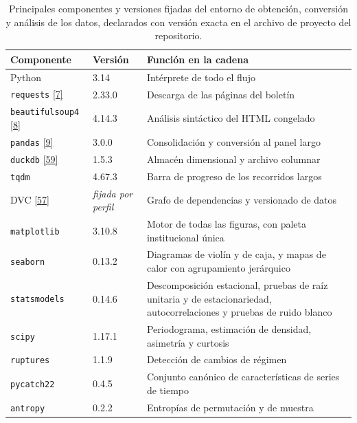 \documentclass[12pt,letterpaper]{report}
\newcommand{\cita}[1]{\hyperref[bib:#1]{[#1]}}
\begin{document}
\begin{table}[H]
\centering
\footnotesize
\caption[Entorno de ejecución]{Principales componentes y versiones fijadas del entorno de
obtención, conversión y análisis de los datos, declarados con versión exacta en el archivo de
proyecto del repositorio.}
\label{tab:entorno}
\begin{tabular}{p{4.0cm}p{2.6cm}p{7.0cm}}
\toprule
\rowcolor{uacjblue!15}
\textbf{Componente} & \textbf{Versión} & \textbf{Función en la cadena} \\ \midrule
Python                            & 3.14     & Intérprete de todo el flujo \\
\texttt{requests} \cita{7}     & 2.33.0   & Descarga de las páginas del boletín \\
\texttt{beautifulsoup4} \cita{8} & 4.14.3 & Análisis sintáctico del HTML congelado \\
\texttt{pandas} \cita{9}    & 3.0.0    & Consolidación y conversión al panel largo \\
\texttt{duckdb} \cita{59}      & 1.5.3    & Almacén dimensional y archivo columnar \\
\texttt{tqdm}                     & 4.67.3   & Barra de progreso de los recorridos largos \\
DVC \cita{57}                  & \textit{fijada por perfil} & Grafo de dependencias y versionado de datos \\
\texttt{matplotlib}               & 3.10.8   & Motor de todas las figuras, con paleta institucional única \\
\texttt{seaborn}                  & 0.13.2   & Diagramas de violín y de caja, y mapas de calor con agrupamiento jerárquico \\
\texttt{statsmodels}              & 0.14.6   & Descomposición estacional, pruebas de raíz unitaria y de estacionariedad, autocorrelaciones y pruebas de ruido blanco \\
\texttt{scipy}                    & 1.17.1   & Periodograma, estimación de densidad, asimetría y curtosis \\
\texttt{ruptures}                 & 1.1.9    & Detección de cambios de régimen \\
\texttt{pycatch22}                & 0.4.5    & Conjunto canónico de características de series de tiempo \\
\texttt{antropy}                  & 0.2.2    & Entropías de permutación y de muestra \\
\bottomrule
\end{tabular}
\end{table}
\end{document}
